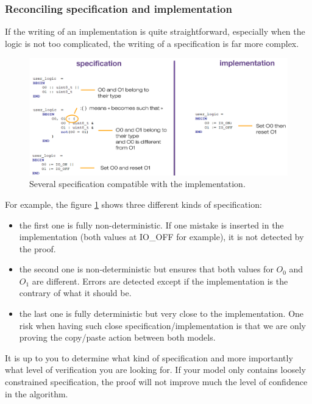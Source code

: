 \subsubsection{Reconciling specification and implementation}

If the writing of an implementation is quite straightforward, especially when the logic is not too complicated, the writing of a specification is far more complex. 
\begin{figure}[ht]
\centering\includegraphics[scale=0.30]{Pictures/chapterProgramming/subst-reconcile.png}
\caption{Several specification compatible with the implementation. }
\label{programming:subst-reconcile}
\end{figure}  
For example, the figure \ref{programming:subst-reconcile} shows three different kinds of specification:
\begin{itemize}
    \item the first one is fully non-deterministic. If one mistake is inserted in the implementation (both values at IO\_OFF for example), it is not detected by the proof.
    \item the second one is non-deterministic but ensures that both values for $O_0$ and $O_1$ are different. Errors are detected except if the implementation is the contrary of what it should be.
    \item the last one is fully deterministic but very close to the implementation. One risk when having such close specification/implementation is that we are only proving the copy/paste action between both models.
\end{itemize}
It is up to you to determine what kind of specification and more importantly what level of verification you are looking for. If your model only contains loosely constrained specification, the proof will not improve much the level of confidence in the algorithm.
